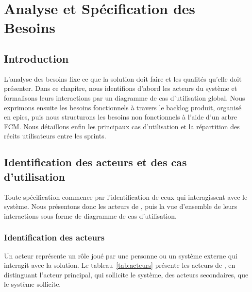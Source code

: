 \chapter{Analyse et Spécification des Besoins}

\section*{Introduction}
L'analyse des besoins fixe ce que la solution doit faire et les qualités qu'elle doit présenter. Dans ce chapitre, nous identifions d'abord les acteurs du système et formalisons leurs interactions par un diagramme de cas d'utilisation global. Nous exprimons ensuite les besoins fonctionnels à travers le backlog produit, organisé en epics, puis nous structurons les besoins non fonctionnels à l'aide d'un arbre FCM. Nous détaillons enfin les principaux cas d'utilisation et la répartition des récits utilisateurs entre les sprints.

\section{Identification des acteurs et des cas d'utilisation}

Toute spécification commence par l'identification de ceux qui interagissent avec le système. Nous présentons donc les acteurs de \projet{}, puis la vue d'ensemble de leurs interactions sous forme de diagramme de cas d'utilisation.

\subsection{Identification des acteurs}

Un acteur représente un rôle joué par une personne ou un système externe qui interagit avec la solution. Le tableau~\ref{tab:acteurs} présente les acteurs de \projet{}, en distinguant l'acteur principal, qui sollicite le système, des acteurs secondaires, que le système sollicite.


